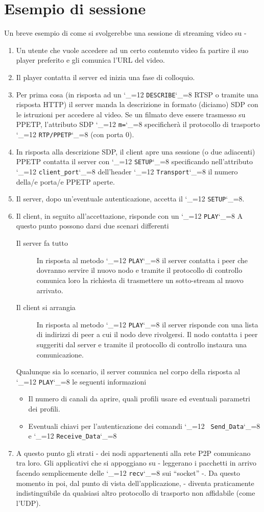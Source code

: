 \documentclass{rfc}
\def\ttt{\catcode`\_=12 \tttii}
\def\tttii#1!{{\tt #1}\catcode`\_=8{}}
\begin{document}
\section{Esempio di sessione}

Un breve esempio di come si svolgerebbe una sessione di streaming
video su \ppetp-

\begin{enumerate}
\item
Un utente che vuole accedere ad un certo contenuto video fa partire il
suo player preferito e gli comunica l'URL del video.
\item
Il player contatta il server ed inizia una fase di colloquio.
\item
Per prima cosa (in risposta ad un \ttt DESCRIBE! RTSP o tramite una
risposta HTTP) il server manda la descrizione in formato (diciamo) SDP
con le istruzioni per accedere al video.  Se un filmato deve essere
trasmesso su PPETP, l'attributo SDP \ttt m=! specificher\`a il
protocollo di trasporto \ttt RTP/PPETP! (con porta 0).
\item
In risposta alla descrizione SDP, il client apre una sessione (o due
adiacenti) PPETP contatta il server con \ttt SETUP! specificando
nell'attributo \ttt client_port! dell'header \ttt Transport! il numero
della/e porta/e PPETP aperte.
\item
Il server, dopo un'eventuale autenticazione, accetta il \ttt SETUP!.
\item
Il client, in seguito all'accettazione, risponde con un \ttt PLAY!  A
questo punto possono darsi due scenari differenti
\begin{description}
  \item[Il server fa tutto] In risposta al metodo \ttt PLAY! il server
  contatta i peer che dovranno servire il nuovo nodo e tramite il
  protocollo di controllo comunica loro la richiesta di trasmettere un
  sotto-stream al nuovo arrivato.
  \item[Il client si arrangia] In risposta al metodo \ttt PLAY! il
  server risponde con una lista di indirizzi di peer a cui il nodo
  deve rivolgersi.  Il nodo contatta i peer suggeriti dal server e
  tramite il protocollo di controllo instaura una comunicazione.
\end{description}
Qualunque sia lo scenario, il server comunica nel corpo della risposta
al \ttt PLAY! le seguenti informazioni
\begin{itemize}
  \item Il numero di canali da aprire, quali profili usare ed
  eventuali parametri dei profili.
  \item Eventuali chiavi per l'autenticazione dei comandi \ttt
  Send_Data! e \ttt Receive_Data!
\end{itemize}
\item
A questo punto gli strati \ppetp- dei nodi appartenenti alla rete P2P
comunicano tra loro.  Gli applicativi che si appoggiano su \ppetp-
leggerano i pacchetti in arrivo facendo semplicemente delle \ttt recv!
sui ``socket'' \ppetp-.  Da questo momento in poi, dal punto di vista
dell'applicazione, \ppetp- diventa praticamente indistinguibile da
qualsiasi altro protocollo di trasporto non affidabile (come l'UDP).
\end{enumerate}
\end{document}
